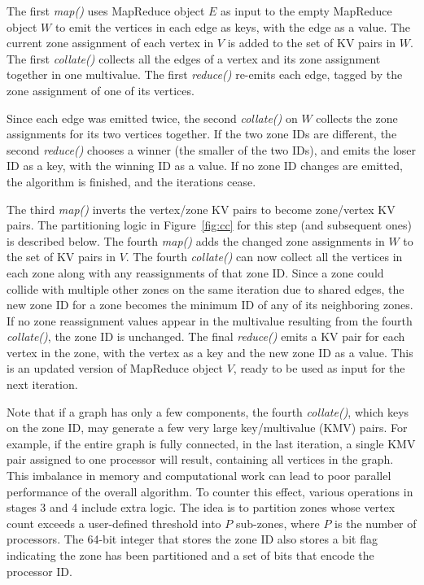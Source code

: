 The first {\it map()} uses MapReduce object $E$ as input to the empty
MapReduce object $W$ to emit the vertices in each edge as keys, with
the edge as a value.  The current zone assignment of each vertex in
$V$ is added to the set of KV pairs in $W$.  The first {\it collate()}
collects all the edges of a vertex and its zone assignment together in
one multivalue.  The first {\it reduce()} re-emits each edge, tagged
by the zone assignment of one of its vertices.

Since each edge was emitted twice, the second {\it collate()} on $W$
collects the zone assignments for its two vertices together.  If the
two zone IDs are different, the second {\it reduce()} chooses a winner
(the smaller of the two IDs), and emits the loser ID as a key, with
the winning ID as a value.  If no zone ID changes are emitted, the
algorithm is finished, and the iterations cease.

The third {\it map()} inverts the vertex/zone KV pairs to become
zone/vertex KV pairs.  The partitioning logic in
Figure~\ref{fig:cc} for this step (and subsequent ones) is described
below.  The fourth {\it map()} adds the changed zone assignments in
$W$ to the set of KV pairs in $V$.  The fourth {\it collate()} can now
collect all the vertices in each zone along with any reassignments of
that zone ID.  Since a zone could collide with multiple other zones on
the same iteration due to shared edges, the new zone ID for a zone
becomes the minimum ID of any of its neighboring zones.  If no zone
reassignment values appear in the multivalue resulting from the fourth
{\it collate()}, the zone ID is unchanged.  The final {\it reduce()}
emits a KV pair for each vertex in the zone, with the vertex as a key
and the new zone ID as a value.  This is an updated version of
MapReduce object $V$, ready to be used as input for the next
iteration.

Note that if a graph has only a few components, the fourth {\it
collate()}, which keys on the zone ID, may generate a few very large
key/multivalue (KMV) pairs.  For example, if the entire graph is fully
connected, in the last iteration, a single KMV pair assigned to one
processor will result, containing all vertices in the graph.  This
imbalance in memory and computational work can lead to poor parallel
performance of the overall algorithm.  To counter this effect, various
operations in stages 3 and 4 include extra logic.  The idea is to
partition zones whose vertex count exceeds a user-defined threshold
into $P$ sub-zones, where $P$ is the number of processors.  The 64-bit
integer that stores the zone ID also stores a bit flag indicating the
zone has been partitioned and a set of bits that encode the processor
ID.

